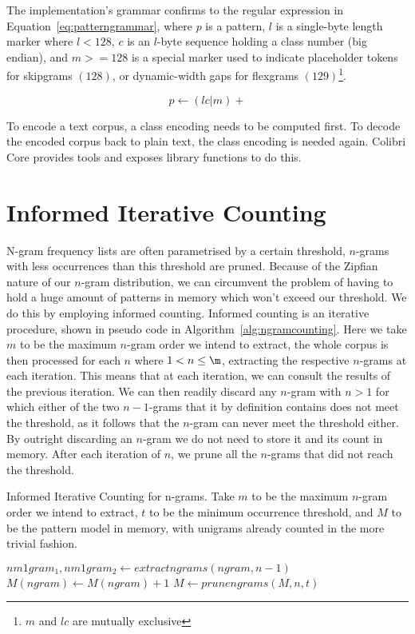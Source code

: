 The implementation's grammar confirms to the regular expression in
Equation~\ref{eq:patterngrammar}, where $p$ is a pattern, $l$ is a single-byte
length marker where $l<128$, $c$ is an $l$-byte sequence holding a class number
(big endian), and $m>=128$ is a special marker used to indicate placeholder
tokens for skipgrams $(128)$, or dynamic-width gaps for flexgrams
$(129)$\footnote{$m$ and $lc$ are mutually exclusive}.

\begin{equation}
\label{eq:patterngrammar}
p \leftarrow (lc|m)+
\end{equation}

To encode a text corpus, a class encoding needs to be computed first. To decode
the encoded corpus back to plain text, the class encoding is needed again.
Colibri Core provides tools and exposes library functions to do this.

\section{Informed Iterative Counting}

N-gram frequency lists are often parametrised by a certain threshold, $n$-grams
with less occurrences than this threshold are pruned. Because of the Zipfian
nature of our $n$-gram distribution, we can circumvent the problem of having to
hold a huge amount of patterns in memory which won't exceed our threshold. We do this by
employing informed counting. Informed counting is an iterative procedure, shown
in pseudo code in Algorithm~\ref{alg:ngramcounting}. Here we take $m$ to be the maximum
$n$-gram order we intend to extract, the whole corpus is then processed for
each $n$ where $1<n\leq\m$, extracting the respective $n$-grams at each
iteration. This means that at each iteration, we can consult the results of the
previous iteration. We can then readily discard any $n$-gram with $n>1$ for
which either of the two $n-1$-grams that it by definition contains does not
meet the threshold, as it follows that the $n$-gram can never meet the
threshold either. By outright discarding an $n$-gram we do not need to store it
and its count in memory. After each iteration of $n$, we prune all the
$n$-grams that did not reach the threshold.


\begin{algorithm} \caption{Informed Iterative Counting for n-grams.  Take $m$
to be the maximum $n$-gram order we intend to extract, $t$ to be the minimum occurrence threshold, and $M$ to be the
pattern model in memory, with unigrams already counted in the more trivial fashion.}
\label{alg:ngramcounting}
\begin{algorithmic}
            \State  $nm1gram_1, nm1gram_2 \leftarrow extractngrams(ngram,n-1)$
                \State $M(ngram) \leftarrow M(ngram) + 1$
            \EndIf
        \EndFor 
      \EndFor
  \EndFor
  \State $M \leftarrow prunengrams(M,n,t)$
\EndFor \\
\end{algorithmic}
\end{algorithm}

